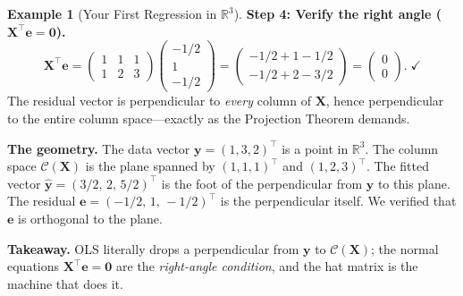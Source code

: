 \documentclass[11pt,a4paper]{article}
\theoremstyle{plain}
\theoremstyle{definition}
\newtheorem{example}[theorem]{Example}
\newcommand{\R}{\mathbb{R}}
\newcommand{\yhat}{\hat{\bm{y}}}
\newcommand{\bX}{\bm{X}}
\newcommand{\by}{\bm{y}}
\newcommand{\be}{\bm{e}}
\newcommand{\Col}{\mathcal{C}}
\begin{document}
\begin{example}[Your First Regression in $\R^3$]
\medskip\noindent\textbf{Step 4: Verify the right angle ($\bX^\top\be = \bm{0}$).}
\[
\bX^\top\be
= \begin{pmatrix} 1 & 1 & 1 \\ 1 & 2 & 3 \end{pmatrix}
  \begin{pmatrix} -1/2 \\ 1 \\ -1/2 \end{pmatrix}
= \begin{pmatrix} -1/2 + 1 - 1/2 \\ -1/2 + 2 - 3/2 \end{pmatrix}
= \begin{pmatrix} 0 \\ 0 \end{pmatrix}. \;\checkmark
\]
The residual vector is perpendicular to \emph{every} column of $\bX$,
hence perpendicular to the entire column space---exactly as the
Projection Theorem demands.

\medskip\noindent\textbf{The geometry.}
The data vector $\by = (1, 3, 2)^\top$ is a point in $\R^3$.
The column space $\Col(\bX)$ is the plane spanned by $(1,1,1)^\top$ and $(1,2,3)^\top$.
The fitted vector $\yhat = (3/2,\, 2,\, 5/2)^\top$ is the foot of the perpendicular from $\by$ to this plane.
The residual $\be = (-1/2,\, 1,\, -1/2)^\top$ is the perpendicular itself.
We verified that $\be$ is orthogonal to the plane.

\medskip\noindent\textbf{Takeaway.}
OLS literally drops a perpendicular from $\by$ to $\Col(\bX)$;
the normal equations $\bX^\top\be=\bm{0}$ are the \emph{right-angle condition},
and the hat matrix is the machine that does it.
\end{example}
\end{document}
